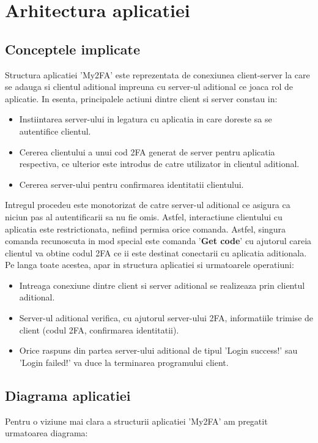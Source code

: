 \documentclass[runningheads]{llncs}
\begin{document}
	
\section{Arhitectura aplicatiei}
\subsection{Conceptele implicate}
\hspace{10pt} Structura aplicatiei 'My2FA' este reprezentata de conexiunea client-server la care se adauga si clientul aditional impreuna cu server-ul aditional ce joaca rol de aplicatie. In esenta, principalele actiuni dintre client si server constau in:
\begin{itemize}
	\item Instiintarea server-ului in legatura cu aplicatia in care doreste sa se autentifice clientul.
	\item Cererea clientului a unui cod 2FA generat de server pentru aplicatia respectiva, ce ulterior este introdus de catre utilizator in clientul aditional.
	\item Cererea server-ului pentru confirmarea identitatii clientului.
\end{itemize}
\hspace{10pt} Intregul procedeu este monotorizat de catre server-ul aditional ce asigura ca niciun pas al autentificarii sa nu fie omis. Astfel, interactiune clientului cu aplicatia este restrictionata, nefiind permisa orice comanda. Astfel, singura comanda recunoscuta in mod special este comanda '\textbf{Get code}' cu ajutorul careia clientul va obtine codul 2FA ce ii este destinat conectarii cu aplicatia aditionala.\\

Pe langa toate acestea, apar in structura aplicatiei si urmatoarele operatiuni:
\begin{itemize}
	\item Intreaga conexiune dintre client si server aditional se realizeaza prin clientul aditional.
	\item Server-ul aditional verifica, cu ajutorul server-ului 2FA, informatiile trimise de client (codul 2FA, confirmarea identitatii).
	\item Orice raspuns din partea server-ului aditional de tipul 'Login success!' sau 'Login failed!' va duce la terminarea programului client.
\end{itemize}

\vspace{2cm}
\subsection{Diagrama aplicatiei}
\hspace{10pt} Pentru o viziune mai clara a structurii aplicatiei 'My2FA' am pregatit urmatoarea diagrama:
\end{document}

